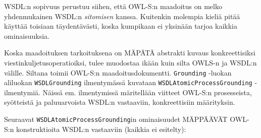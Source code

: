 \documentclass[finnish]{tktltiki2}
\theoremstyle{definition}
\theoremstyle{remark}
\begin{document}
WSDL:n sopivuus perustuu siihen, että OWL-S:n maadoitus on melko yhdenmukainen WSDL:n \textit{sitomisen} kanssa\cite{OWLS}. Kuitenkin molempia kieliä pitää käyttää toisiaan täydentävästi, koska kumpikaan ei yksinään tarjoa kaikkia ominaisuuksia. 


Koska maadoituksen tarkoituksena on MÄPÄTÄ abstrakti kuvaus konkreettisiksi viestinkuljetusoperatioiksi, tulee muodostaa ikään kuin silta OWLS-n ja WSDL:n välille. Siltana toimii OWL-S:n maadoitusdokumentti. \texttt{Grounding} -luokan aliluokan \texttt{WSDLGrounding} ilmentymässä kuvataan \texttt{WSDLAtomicProcessGrounding} -ilmentymiä. Näissä em. ilmentymissä märitellään viitteet OWL-S:n  prosesseista, syötteistä ja paluuarvoista WSDL:n vastaaviin, konkreettisiin määrityksin. 

Seuraavat \texttt{WSDLAtomicProcessGrounding}in ominaisuudet MÄPPÄÄVÄT OWL-S:n konstruktioita WSDL:n vastaaviin (kaikkia ei esitelty):
\end{document}
